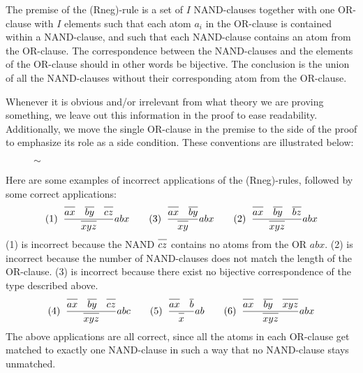 The premise of the (Rneg)-rule is a set of $I$ NAND-clauses together with one OR-clause with $I$ elements such that each atom $a_i$ in the OR-clause is contained within a NAND-clause, and such that each NAND-clause contains an atom from the OR-clause.
The correspondence between the NAND-clauses and the elements of the OR-clause should in other words be bijective.
The conclusion is the union of all the NAND-clauses without their corresponding atom from the OR-clause.

Whenever it is obvious and/or irrelevant from what theory we are proving something, we leave out this information in the proof to ease readability.
Additionally, we move the single OR-clause in the premise to the side of the proof to emphasize its role as a side condition.
These conventions are illustrated below:\par
\begin{figure}[!h]
  \centering
  \begin{prooftree}
  \end{prooftree}
  \hspace{2mm} $\sim$ \hspace{2mm}
  \begin{prooftree}
  \end{prooftree}
  \caption{}
  \label{fig:proof_convention}
\end{figure}
Here are some examples of incorrect applications of the (Rneg)-rules, followed by some correct applications:
\begin{align*}
  (1)\;\;\frac{\ol{ax}\quad\ol{by}\quad\ol{cz}}{\ol{xyz}}abx\quad\quad
  (3)\;\;\frac{\ol{ax}\quad\ol{by}}{\ol{xy}}abx\quad\quad
  (2)\;\;\frac{\ol{ax}\quad\ol{by}\quad\ol{bz}}{\ol{xyz}}abx
\end{align*}
(1) is incorrect because the NAND $\ol{cz}$ contains no atoms from the OR $abx$.
(2) is incorrect because the number of NAND-clauses does not match the length of the OR-clause.
(3) is incorrect because there exist no bijective correspondence of the type described above.
\begin{align*}
  (4)\;\;\frac{\ol{ax}\quad\ol{by}\quad\ol{cz}}{\ol{xyz}}abc\quad\quad
  (5)\;\;\frac{\ol{ax}\quad\ol{b}}{\ol{x}}ab\quad\quad
  (6)\;\;\frac{\ol{ax}\quad\ol{by}\quad\ol{xyz}}{\ol{xyz}}abx
\end{align*}
The above applications are all correct, since all the atoms in each OR-clause get matched to exactly one NAND-clause in such a way that no NAND-clause stays unmatched.

